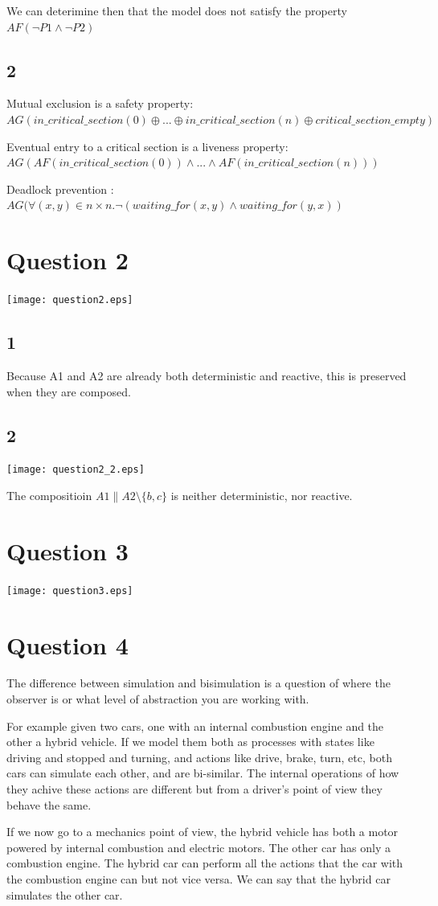 \documentclass{scrartcl}
\begin{document}
We can deterimine then that the model does not satisfy the property $AF(\neg P1 \wedge \neg P2)$

\subsection{2}
Mutual exclusion is a safety property: 
$AG(in\_critical\_section(0)  \oplus ...\oplus in\_critical\_section(n) \oplus critical\_section\_empty)$

Eventual entry to a critical section is a liveness property: $AG(AF(in\_critical\_section(0)) \wedge ... \wedge AF(in\_critical\_section(n)))$

Deadlock prevention : $AG(\forall (x, y) \in n \times n. \neg (waiting\_for(x, y) \wedge waiting\_for(y, x))$

\section{Question 2}
\texttt{[image: question2.eps]}
\subsection{1}
Because A1 and A2 are already both deterministic and reactive, this is preserved when they are composed.
\subsection{2}
\texttt{[image: question2\_2.eps]}

The compositioin $A1 \| A2 \setminus \{b, c\}$ is neither deterministic, nor reactive.
\section{Question 3}
\texttt{[image: question3.eps]}
\section{Question 4}
The difference between simulation and bisimulation is a question of where the observer is or what level of abstraction you are working with.

For example given two cars, one with an internal combustion engine and the other a hybrid vehicle. If we model them both as processes with states like driving and stopped and turning, and actions like drive, brake, turn, etc, both cars can simulate each other, and are bi-similar. The internal operations of how they achive these actions are different but from a driver's point of view they behave the same.

If we now go to a mechanics point of view, the hybrid vehicle has both a motor powered by internal combustion and electric motors. The other car has only a combustion engine. The hybrid car can perform all the actions that the car with the combustion engine can but not vice versa. We can say that the hybrid car simulates the other car.
\end{document}
